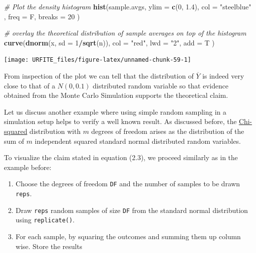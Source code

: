 \documentclass[]{book}
\newenvironment{Shaded}{\begin{snugshade}}{\end{snugshade}}
\newcommand{\KeywordTok}[1]{\textcolor[rgb]{0.13,0.29,0.53}{\textbf{#1}}}
\newcommand{\DataTypeTok}[1]{\textcolor[rgb]{0.13,0.29,0.53}{#1}}
\newcommand{\DecValTok}[1]{\textcolor[rgb]{0.00,0.00,0.81}{#1}}
\newcommand{\FloatTok}[1]{\textcolor[rgb]{0.00,0.00,0.81}{#1}}
\newcommand{\StringTok}[1]{\textcolor[rgb]{0.31,0.60,0.02}{#1}}
\newcommand{\CommentTok}[1]{\textcolor[rgb]{0.56,0.35,0.01}{\textit{#1}}}
\newcommand{\OperatorTok}[1]{\textcolor[rgb]{0.81,0.36,0.00}{\textbf{#1}}}
\newcommand{\NormalTok}[1]{#1}
\providecommand{\tightlist}{%
  \setlength{\itemsep}{0pt}\setlength{\parskip}{0pt}}
\theoremstyle{definition}
\theoremstyle{definition}
\theoremstyle{definition}
\theoremstyle{remark}
\begin{document}
\begin{Shaded}
\begin{Highlighting}[]
\CommentTok{# Plot the density histogram}
\KeywordTok{hist}\NormalTok{(sample.avgs, }
     \DataTypeTok{ylim =} \KeywordTok{c}\NormalTok{(}\DecValTok{0}\NormalTok{, }\FloatTok{1.4}\NormalTok{), }
     \DataTypeTok{col =} \StringTok{"steelblue"}\NormalTok{ , }
     \DataTypeTok{freq =}\NormalTok{ F, }
     \DataTypeTok{breaks =} \DecValTok{20}
\NormalTok{     )}

\CommentTok{# overlay the theoretical distribution of sample averages on top of the histogram}
\KeywordTok{curve}\NormalTok{(}\KeywordTok{dnorm}\NormalTok{(x, }\DataTypeTok{sd =} \DecValTok{1}\OperatorTok{/}\KeywordTok{sqrt}\NormalTok{(n)), }
      \DataTypeTok{col =} \StringTok{"red"}\NormalTok{, }
      \DataTypeTok{lwd =} \StringTok{"2"}\NormalTok{, }
      \DataTypeTok{add =}\NormalTok{ T}
\NormalTok{      )}
\end{Highlighting}
\end{Shaded}

\begin{center}\texttt{[image: URFITE\_files/figure-latex/unnamed-chunk-59-1]} \end{center}

From inspection of the plot we can tell that the distribution of
\(\overline{Y}\) is indeed very close to that of a \(N(0, 0.1)\)
distributed random variable so that evidence obtained from the Monte
Carlo Simulation supports the theoretical claim.

Let us discuss another example where using simple random sampling in a
simulation setup helps to verify a well known result. As discussed
before, the \protect\hyperlink{chisquare}{Chi-squared} distribution with
\(m\) degrees of freedom arises as the distribution of the sum of \(m\)
independent squared standard normal distributed random variables.

To visualize the claim stated in equation (2.3), we proceed similarly as
in the example before:

\begin{enumerate}
\def\labelenumi{\arabic{enumi}.}
\tightlist
\item
  Choose the degrees of freedom \texttt{DF} and the number of samples to
  be drawn \texttt{reps}.
\item
  Draw \texttt{reps} random samples of size \texttt{DF} from the
  standard normal distribution using \texttt{replicate()}.
\item
  For each sample, by squaring the outcomes and summing them up column
  wise. Store the results
\end{enumerate}
\end{document}
